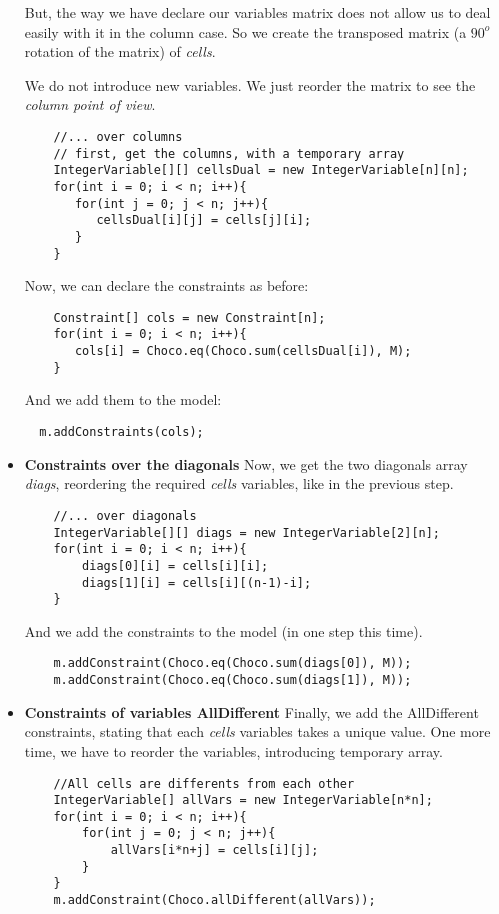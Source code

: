\begin{itemize}
But, the way we have declare our variables matrix does not allow us to deal easily with it in the column case. So we create the transposed matrix (a $90^o$ rotation of the matrix) of \emph{cells}.
\begin{note}
We do not introduce new variables. We just reorder the matrix to see the \emph{column point of view}.
\end{note}
\begin{lstlisting}
	//... over columns
	// first, get the columns, with a temporary array
	IntegerVariable[][] cellsDual = new IntegerVariable[n][n];
	for(int i = 0; i < n; i++){
	   for(int j = 0; j < n; j++){
	      cellsDual[i][j] = cells[j][i];
	   }
	}
\end{lstlisting}
Now, we can declare the constraints as before:
\begin{lstlisting}
	Constraint[] cols = new Constraint[n];
	for(int i = 0; i < n; i++){
	   cols[i] = Choco.eq(Choco.sum(cellsDual[i]), M);
	}
\end{lstlisting}
And we add them to the model:
\begin{lstlisting}
  m.addConstraints(cols);
\end{lstlisting}
\item
\textbf{Constraints over the diagonals}\label{gettingstarted:constraintsoverthediagonals}\hypertarget{gettingstarted:constraintsoverthediagonals}{}
Now, we get the two diagonals array \emph{diags}, reordering the required \emph{cells} variables, like in the previous step.
\begin{lstlisting}
	//... over diagonals                                  
	IntegerVariable[][] diags = new IntegerVariable[2][n];
	for(int i = 0; i < n; i++){                           
	    diags[0][i] = cells[i][i];                        
	    diags[1][i] = cells[i][(n-1)-i];                  
	}
\end{lstlisting} 
And we add the constraints to the model (in one step this time).
\begin{lstlisting}
	m.addConstraint(Choco.eq(Choco.sum(diags[0]), M));    
	m.addConstraint(Choco.eq(Choco.sum(diags[1]), M));
\end{lstlisting}
\item
\textbf{Constraints of variables AllDifferent}\label{gettingstarted:constraintsofvariablesalldifferent}\hypertarget{gettingstarted:constraintsofvariablesalldifferent}{}
Finally, we add the AllDifferent constraints, stating that each \emph{cells} variables takes a unique value. 
One more time, we have to reorder the variables, introducing temporary array.
\begin{lstlisting}
	//All cells are differents from each other           
	IntegerVariable[] allVars = new IntegerVariable[n*n];
	for(int i = 0; i < n; i++){                          
	    for(int j = 0; j < n; j++){                      
	        allVars[i*n+j] = cells[i][j];                
	    }                                                
	}                                                    
	m.addConstraint(Choco.allDifferent(allVars));
\end{lstlisting}
\end{itemize}

